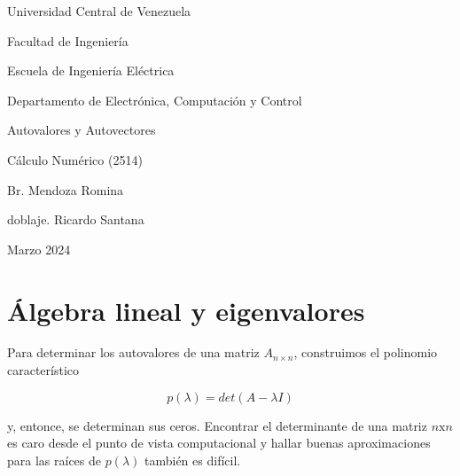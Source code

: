 \documentclass{report}
\numberwithin{subsection}{section} %
\begin{document}
\doublespacing

\begin{titlepage}
    \centering
    {\large Universidad Central de Venezuela \par}
    {\large Facultad de Ingeniería \par}
    {\large Escuela de Ingeniería Eléctrica \par}
    {\large Departamento de Electrónica, Computación y Control \par}
    \vspace*{\fill}
    {\Huge Autovalores y Autovectores \par} %
    {\LARGE Cálculo Numérico (2514) \par}
    \vspace*{\fill}
    \begin{flushright}
    {\Large Br. Mendoza Romina \par doblaje. Ricardo Santana}
    \end{flushright}
    \vfill
    {\large Marzo 2024 \par}
\end{titlepage}

\begin{abstract}
    
    El escrito a presentar contiene los conocimientos mínimos necesarios para discutir y profundizar, en clase, de los temas: Autovalores y autovectores, y el método de potencia.

\end{abstract}%

\section{\textnormal{Álgebra lineal y eigenvalores}} %

Para determinar los autovalores de una matriz $ A _{n\times n} $, construimos el polinomio característico

\begin{equation}
p \left( \lambda \right) = det \left( A - \lambda I \right)
\end{equation}

y, entonce, se determinan sus ceros. Encontrar el determinante de una matriz $ n\text{x}n $ es caro desde el punto de vista computacional y hallar buenas aproximaciones para las raíces de $ p \left( \lambda \right) $ también es difícil.
\end{document}
